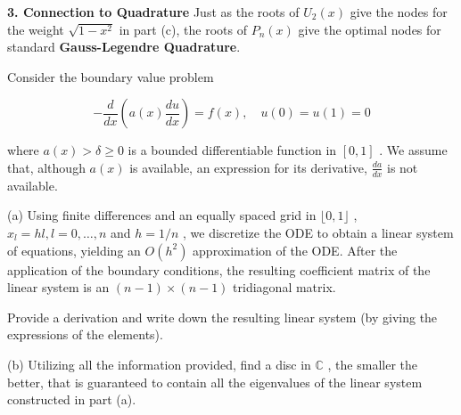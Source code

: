 \textbf{3. Connection to Quadrature}
Just as the roots of $U_2(x)$ give the nodes for the weight $\sqrt{1-x^2}$ in part (c), the roots of $P_n(x)$ give the optimal nodes for standard \textbf{Gauss-Legendre Quadrature}.


\begin{exercise}
\label{applied:2024:4}
Consider the boundary value problem

\[
- \frac {d}{d x} \left(a (x) \frac {d u}{d x}\right) = f (x), \quad u (0) = u (1) = 0
\]

where $a ( x ) > \delta \geq 0$ is a bounded differentiable function in $[ 0 , 1 ]$ . We assume that, although $a ( x )$ is available, an expression for its derivative, $\frac { d a } { d x }$ is not available.

(a) Using finite differences and an equally spaced grid in $\lfloor 0 , 1 \rfloor$ , $x _ { l } = h l , l = 0 , \ldots , n$ and $h = 1 / n$ , we discretize the ODE to obtain a linear system of equations, yielding an $O ( h ^ { 2 } )$ approximation of the ODE. After the application of the boundary conditions, the resulting coefficient matrix of the linear system is an $( n - 1 ) \times ( n - 1 )$ tridiagonal matrix.

Provide a derivation and write down the resulting linear system (by giving the expressions of the elements).

(b) Utilizing all the information provided, find a disc in $\mathbb { C }$ , the smaller the better, that is guaranteed to contain all the eigenvalues of the linear system constructed in part (a).
\end{exercise}

